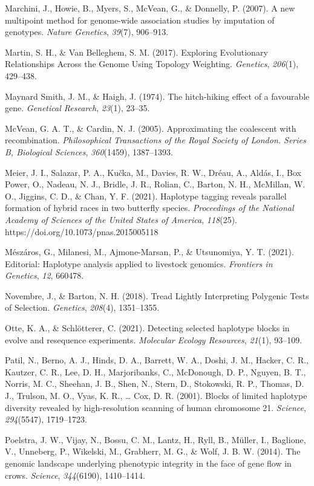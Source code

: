\documentclass[twocolumn]{bmcart}%
\begin{document}
\begin{backmatter}
\begin{hangparas}{1em}{1}
Marchini, J., Howie, B., Myers, S., McVean, G., \& Donnelly, P. (2007).
A new multipoint method for genome-wide association studies by
imputation of genotypes. \emph{Nature Genetics}, \emph{39}(7), 906--913.

Martin, S. H., \& Van Belleghem, S. M. (2017). Exploring Evolutionary
Relationships Across the Genome Using Topology Weighting.
\emph{Genetics}, \emph{206}(1), 429--438.

Maynard Smith, J. M., \& Haigh, J. (1974). The hitch-hiking effect of a
favourable gene. \emph{Genetical Research}, \emph{23}(1), 23--35.

McVean, G. A. T., \& Cardin, N. J. (2005). Approximating the coalescent
with recombination. \emph{Philosophical Transactions of the Royal
Society of London. Series B, Biological Sciences}, \emph{360}(1459),
1387--1393.

Meier, J. I., Salazar, P. A., Kučka, M., Davies, R. W., Dréau, A.,
Aldás, I., Box Power, O., Nadeau, N. J., Bridle, J. R., Rolian, C.,
Barton, N. H., McMillan, W. O., Jiggins, C. D., \& Chan, Y. F. (2021).
Haplotype tagging reveals parallel formation of hybrid races in two
butterfly species. \emph{Proceedings of the National Academy of Sciences
of the United States of America}, \emph{118}(25).
https://doi.org/10.1073/pnas.2015005118

Mészáros, G., Milanesi, M., Ajmone-Marsan, P., \& Utsunomiya, Y. T.
(2021). Editorial: Haplotype analysis applied to livestock genomics.
\emph{Frontiers in Genetics}, \emph{12}, 660478.

Novembre, J., \& Barton, N. H. (2018). Tread Lightly Interpreting
Polygenic Tests of Selection. \emph{Genetics}, \emph{208}(4),
1351--1355.

Otte, K. A., \& Schlötterer, C. (2021). Detecting selected haplotype
blocks in evolve and resequence experiments. \emph{Molecular Ecology
Resources}, \emph{21}(1), 93--109.

Patil, N., Berno, A. J., Hinds, D. A., Barrett, W. A., Doshi, J. M.,
Hacker, C. R., Kautzer, C. R., Lee, D. H., Marjoribanks, C., McDonough,
D. P., Nguyen, B. T., Norris, M. C., Sheehan, J. B., Shen, N., Stern,
D., Stokowski, R. P., Thomas, D. J., Trulson, M. O., Vyas, K. R.,
\ldots{} Cox, D. R. (2001). Blocks of limited haplotype diversity
revealed by high-resolution scanning of human chromosome 21.
\emph{Science}, \emph{294}(5547), 1719--1723.

Poelstra, J. W., Vijay, N., Bossu, C. M., Lantz, H., Ryll, B., Müller,
I., Baglione, V., Unneberg, P., Wikelski, M., Grabherr, M. G., \& Wolf,
J. B. W. (2014). The genomic landscape underlying phenotypic integrity
in the face of gene flow in crows. \emph{Science}, \emph{344}(6190),
1410--1414.


\end{hangparas}
\end{backmatter}
\end{document}
